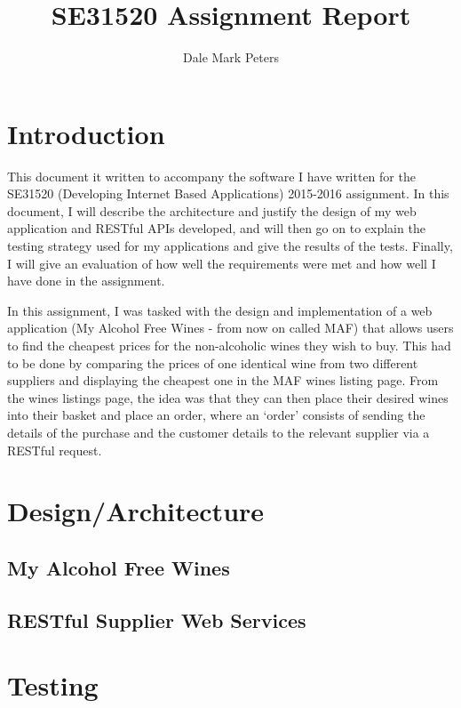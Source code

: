\documentclass[a4paper,12pt,hidelinks]{report}
\title{SE31520 Assignment Report}
\author{Dale Mark Peters}
\begin{document}
\maketitle

\renewcommand{\abstractname}{Acknowledgements}
\begin{abstract}
\end{abstract}
\restoregeometry

\tableofcontents\newpage
\chapter{Introduction}
    This document it written to accompany the software I have written for the SE31520 (Developing Internet Based Applications) 2015-2016 assignment. In this
    document, I will describe the architecture and justify the design of my web application and RESTful APIs developed, and will then go on
    to explain the testing strategy used for my applications and give the results of the tests. Finally, I will give an evaluation of how well the requirements
    were met and how well I have done in the assignment.

    In this assignment, I was tasked with the design and implementation of a web application (My Alcohol Free Wines - from now on called MAF) that allows users to find the cheapest prices
    for the non-alcoholic wines they wish to buy. This had to be done by comparing the prices of one identical wine from two different suppliers and displaying the
    cheapest one in the MAF wines listing page. From the wines listings page, the idea was that they can then place their desired wines into their basket and place
    an order, where an `order' consists of sending the details of the purchase and the customer details to the relevant supplier via a RESTful request.

\chapter{Design/Architecture}
    \section{My Alcohol Free Wines}
    \blindtext
    \section{RESTful Supplier Web Services}
    \blindtext
\chapter{Testing}
\end{document}
